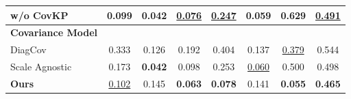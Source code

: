 \begin{table}[ht]
{\begin{tabular}{lccccccc}
\hspace{2mm}w/o CovKP           & \textbf{0.099} & \textbf{0.042} & \underline{0.076} & \underline{0.247} & \textbf{0.059} & 0.629 & \underline{0.491} \\
\midrule
\textbf{Covariance Model}\\
\hspace{2mm}DiagCov         & 0.333 & 0.126 & 0.192 & 0.404 & 0.137 & \underline{0.379} & 0.544 \\
\hspace{2mm}Scale Agnostic  & 0.173 & \textbf{0.042} & 0.098 & 0.253 & \underline{0.060} & 0.500& 0.498 \\
\midrule
\textbf{Ours}  & \underline{0.102} & 0.145 & \textbf{0.063} & \textbf{0.078} & 0.141 & \textbf{0.055} & \textbf{0.465} \\
\bottomrule
\end{tabular}}
\label{tab: Ablation Hard}
\end{table}
